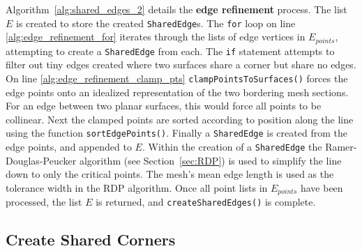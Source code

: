 Algorithm~\ref{alg:shared_edges_2} details the \textbf{edge refinement} process.
The list $E$ is created to store the created \verb|SharedEdge|s.
The \verb|for| loop on line \ref{alg:edge_refinement_for} iterates through the lists of edge vertices in $E_{points}$, attempting to create a \verb|SharedEdge| from each.
The \verb|if| statement attempts to filter out tiny edges created where two surfaces share a corner but share no edges.
On line \ref{alg:edge_refinement_clamp_pts} \verb|clampPointsToSurfaces()| forces the edge points onto an idealized representation of the two bordering mesh sections.
For an edge between two planar surfaces, this would force all points to be collinear.
Next the clamped points are sorted according to position along the line using the function \verb|sortEdgePoints()|.
Finally a \verb|SharedEdge| is created from the edge points, and appended to $E$.
Within the creation of a \verb|SharedEdge| the Ramer-Douglas-Peucker algorithm (see Section~\ref{sec:RDP}) is used to simplify the line down to only the critical points.
The mesh's mean edge length is used as the tolerance width in the RDP algorithm.
Once all point lists in $E_{points}$ have been processed, the list $E$ is returned, and \verb|createSharedEdges()| is complete.

\subsection{Create Shared Corners}

